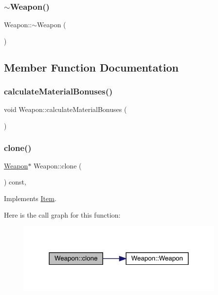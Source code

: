\subsubsection{\texorpdfstring{$\sim$\+Weapon()}{~Weapon()}}
{\footnotesize\ttfamily Weapon\+::$\sim$\+Weapon (\begin{DoxyParamCaption}{ }\end{DoxyParamCaption})}



\subsection{Member Function Documentation}
\mbox{\label{class_weapon_ad7be6ba61b660d807b5b56c289defbde}} 
\subsubsection{\texorpdfstring{calculate\+Material\+Bonuses()}{calculateMaterialBonuses()}}
{\footnotesize\ttfamily void Weapon\+::calculate\+Material\+Bonuses (\begin{DoxyParamCaption}{ }\end{DoxyParamCaption})}

\mbox{\label{class_weapon_a4a914fa26d1d67a5d890252950f6b9be}} 
\subsubsection{\texorpdfstring{clone()}{clone()}}
{\footnotesize\ttfamily \mbox{\hyperlink{class_weapon}{Weapon}}$\ast$ Weapon\+::clone (\begin{DoxyParamCaption}{ }\end{DoxyParamCaption}) const\hspace{0.3cm}{\ttfamily [inline]}, {\ttfamily [virtual]}}



Implements \mbox{\hyperlink{class_item_a6d963581e2caad2e08979683a827f39f}{Item}}.

Here is the call graph for this function\+:
\nopagebreak
\begin{figure}[H]
\begin{center}
\leavevmode
\includegraphics[width=294pt]{class_weapon_a4a914fa26d1d67a5d890252950f6b9be_cgraph}
\end{center}
\end{figure}
\mbox{\label{class_weapon_a0755dc1352391eb484644ab4e4cf144d}} 
